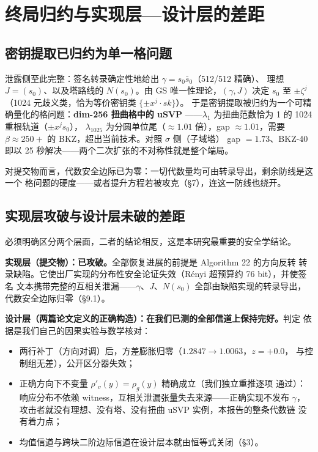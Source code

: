 \documentclass[UTF8,11pt,a4paper]{ctexart}
\begin{document}
\section{终局归约与实现层—设计层的差距}

\subsection{密钥提取已归约为单一格问题}

泄露侧至此完整：签名转录确定性地给出 $\gamma = s_0 \bar s_0$（512/512 精确）、
理想 $J = (s_0)$、以及塔路线的 $N(s_0)$。由 GS 唯一性理论，$(\gamma, J)$ 决定
$s_0$ 至 $\pm\zeta^j$（1024 元歧义类，恰为等价密钥类 $\{\pm x^j\cdot sk\}$）。
于是密钥提取被归约为一个可精确量化的格问题：\textbf{dim-256 扭曲格中的 uSVP}
——$\lambda_1$ 为扭曲范数恰为 1 的 1024 重根轨道（$\pm x^j s_0$），
$\lambda_{1025}$ 为分圆单位尾（$\approx 1.01$ 倍），gap $\approx 1.01$，需要
$\beta \approx 250{+}$ 的 BKZ，超出当前技术。对照 $\sigma$ 侧（子域塔）
gap $= 1.73$、BKZ-40 即以 25 秒解决——两个二次扩张的不对称性就是整个端局。

对提交物而言，代数安全边际已为零：一切代数量均可由转录导出，剩余防线是这一个
格问题的硬度——或者提升方程若被攻克（\S7），连这一防线也绕开。

\subsection{实现层攻破与设计层未破的差距}

必须明确区分两个层面，二者的结论相反，这是本研究最重要的安全学结论。

\textbf{实现层（提交物）：已攻破。}全部恢复进展的前提是 Algorithm 22 的方向反转
转录缺陷。它使出厂实现的分布性安全论证失效（R\'enyi 超预算约 76 bit），并使签名
文本携带完整的互相关泄漏——$\gamma$、$J$、$N(s_0)$ 全部由缺陷实现的转录导出，
代数安全边际归零（\S9.1）。

\textbf{设计层（两篇论文定义的正确构造）：在我们已测的全部信道上保持完好。}判定
依据是我们自己的因果实验与数学核对：
\begin{itemize}
\item 两行补丁（方向对调）后，方差膨胀归零（$1.2847 \to 1.0063$，$z = +0.0$，
  与控制组无差），公开区分器失效；
\item 正确方向下不变量 $\rho'_v(y) = \rho_g(y)$ 精确成立（我们独立重推逐项
  通过）：响应分布不依赖 witness，互相关泄漏张量失去来源——正确实现不发布
  $\gamma$，攻击者就没有理想、没有塔、没有扭曲 uSVP 实例，本报告的整条代数链
  没有着力点；
\item 均值信道与跨块二阶边际信道在设计层本就由恒等式关闭（\S3）。
\end{itemize}
\end{document}
